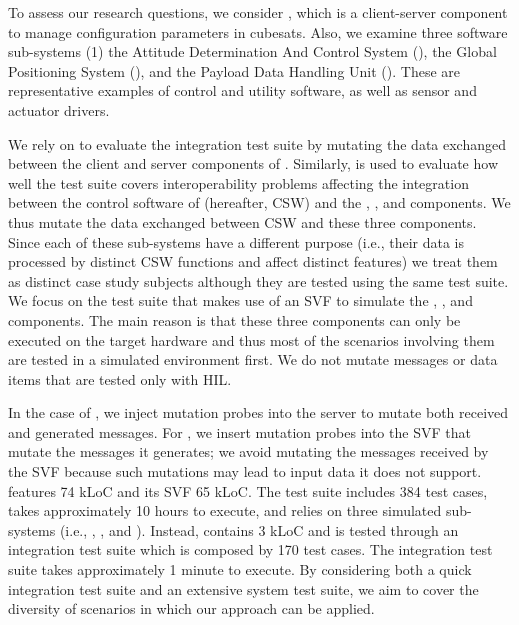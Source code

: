 To assess our research questions, we consider \PARAM, which is a client-server component to manage configuration parameters in cubesats.
Also, we examine three \ESAIL software sub-systems (1) the Attitude Determination And Control System (\ADCS), the Global Positioning System (\GPS), and the Payload Data Handling Unit (\PDHU). {These are representative examples of control and utility software, as well as sensor and actuator drivers.} 

We rely on \APPR to evaluate the \PARAM integration test suite by  mutating the data exchanged between the client and server components of \PARAM.
Similarly, \APPR is used to evaluate how well the 
\ESAIL test suite covers interoperability problems affecting the integration between the control software of \ESAIL (hereafter, CSW) and the \ADCS, \PDHU, and \GPS components. We thus
mutate the data exchanged between \ESAIL CSW and these three components.
Since each of these sub-systems have a  different purpose (i.e., their data is processed by distinct CSW functions and affect distinct \ESAIL features) we treat them as distinct case study subjects although they are tested using the same test suite. We focus on the \ESAIL test suite that makes use of an SVF to simulate the \ADCS, \PDHU, and \GPS components. 
The main reason is that these three components can only be executed on the target hardware and thus most of the scenarios involving them are tested in a simulated environment first.
We do not mutate messages or data items that are tested only with HIL.

In the case of \PARAM, we inject mutation probes into the \PARAM server to mutate both received and generated messages. For \ESAIL, we insert mutation probes into the SVF that mutate the messages it generates; we avoid mutating the messages received by the SVF because such mutations may lead to input data it does not support. 
\ESAIL features 74 kLoC and its SVF 65 kLoC. 
The \ESAIL test suite includes 384 test cases, takes approximately 10 hours to execute, and relies on three simulated
\SVF sub-systems (i.e., \ADCS, \GPS, and \PDHU).
Instead, \PARAM contains 3 kLoC and is tested through an integration test suite which is composed by 170 test cases. 
The \PARAM integration test suite takes approximately 1 minute to execute.
By considering both a quick integration test suite and an extensive system test suite, we aim to cover the diversity of scenarios in which our approach can be applied.


